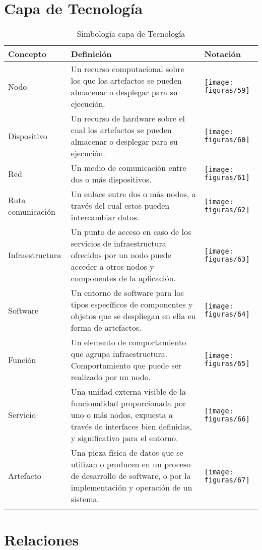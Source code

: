 \section{Capa de Tecnología}
  \begin{longtable}
	{|m{3cm}|m{4.8cm}|m{4.8cm}|}
	\toprule
	Concepto & Definición & Notación \\
	\midrule
	Nodo & Un recurso computacional sobre los que los artefactos se pueden almacenar o desplegar para su ejecución. & \texttt{[image: figuras/59]} \\ \hline
	Dispositivo & Un recurso de hardware sobre el cual los artefactos se pueden almacenar o desplegar para su ejecución. & \texttt{[image: figuras/60]} \\ \hline
	Red & Un medio de comunicación entre dos o más dispositivos. & \texttt{[image: figuras/61]} \\ \hline
	Ruta comunicación & Un enlace entre dos o más nodos, a través del cual estos pueden intercambiar datos. & \texttt{[image: figuras/62]} \\ \hline
	Infraestructura & Un punto de acceso en caso de los servicios de infraestructura ofrecidos por un nodo puede acceder a otros nodos y componentes de la aplicación. & \texttt{[image: figuras/63]} \\ \hline
	Software & Un entorno de software para los tipos específicos de componentes y objetos que se despliegan en ella en forma de artefactos. & \texttt{[image: figuras/64]} \\ \hline
	Función & Un elemento de comportamiento que agrupa infraestructura. Comportamiento que puede ser realizado por un nodo. & \texttt{[image: figuras/65]} \\ \hline
	Servicio & Una unidad externa visible de la funcionalidad proporcionada por uno o más nodos, expuesta a través de interfaces bien definidas, y significativo para el entorno. & \texttt{[image: figuras/66]} \\ \hline
	Artefacto & Una pieza física de datos que se utilizan o producen en un proceso de desarrollo de software, o por la implementación y operación de un sistema. & \texttt{[image: figuras/67]} \\
	\bottomrule
	\captionsetup{width=.95\textwidth}
	\caption{Simbología capa de Tecnología}
	\label{tabla31}
  \end{longtable}
  
\section{Relaciones}
